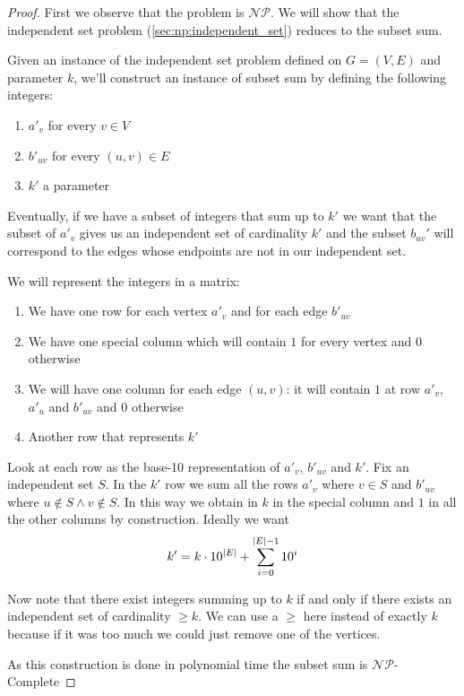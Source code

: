 \documentclass[12pt]{extarticle}
\newcommand{\NP}{{\mathcal{NP}}}
\newcommand{\NPC}{$\NP$-Complete}
\begin{document}
\begin{proof}
    First we observe that the problem is $\NP$. We will show that the independent set problem (\autoref{sec:np:independent_set}) reduces to the subset sum.

    Given an instance of the independent set problem defined on $G = (V, E)$ and parameter $k$, we'll construct an instance of subset sum by defining the following integers:
    \begin{enumerate}
        \item $a'_v$ for every $v \in V$
        \item $b'_{uv}$ for every $(u, v) \in E$
        \item $k'$ a parameter
    \end{enumerate}

    Eventually, if we have a subset of integers that sum up to $k'$ we want that the subset of $a'_v$ gives us an independent set of cardinality $k'$ and the subset $b_{uv}'$ will correspond to the edges whose endpoints are not in our independent set.

    We will represent the integers in a matrix:
    \begin{enumerate}
        \item We have one row for each vertex $a'_v$ and for each edge $b'_{uv}$
        \item We have one special column which will contain $1$ for every vertex and $0$ otherwise
        \item We will have one column for each edge $(u, v)$: it will contain $1$ at row $a'_v$, $a'_u$ and $b'_{uv}$ and $0$ otherwise
        \item Another row that represents $k'$
    \end{enumerate}

    Look at each row as the base-10 representation of $a'_v$, $b'_{uv}$ and $k'$.
    Fix an independent set $S$.
    In the $k'$ row we sum all the rows $a'_v$ where $v \in S$ and $b'_{uv}$ where $u \notin S \land v \notin S$.
    In this way we obtain in $k$ in the special column and $1$ in all the other columns by construction. Ideally we want
    \begin{equation}
        k' = k \cdot 10^{\abs{E}} + \sum^{\abs{E}-1}_{i = 0} 10^i
    \end{equation}

    Now note that there exist integers summing up to $k$ if and only if there exists an independent set of cardinality $\geq k$.
    We can use a $\geq$ here instead of exactly $k$ because if it was too much we could just remove one of the vertices.

    As this construction is done in polynomial time the subset sum is \NPC
\end{proof}
\end{document}
